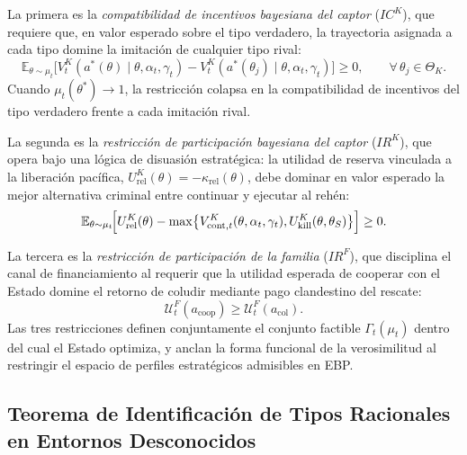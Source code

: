 \documentclass[review,authoryear,12pt]{elsarticle}
\theoremstyle{plain}
\theoremstyle{definition}
\newcommand{\E}{\mathbb{E}}
\newcommand{\ThetaK}{\Theta_K}
\newcommand{\1}{\mathbf{1}}
\begin{document}
La primera es la \emph{compatibilidad de incentivos bayesiana del captor} ($IC^K$), que requiere que, en valor esperado sobre el tipo verdadero, la trayectoria asignada a cada tipo domine la imitación de cualquier tipo rival:
\begin{equation}
\E_{\theta\sim\mu_t}\!\bigl[V^K_t(a^\ast(\theta)\mid\theta,\alpha_t,\gamma_t)-V^K_t(a^\ast(\theta_j)\mid\theta,\alpha_t,\gamma_t)\bigr]\ge 0,\qquad\forall\,\theta_j\in\ThetaK.
\label{eq:ic-kidnapper}
\end{equation}
Cuando $\mu_t(\theta^\ast)\to 1$, la restricción colapsa en la compatibilidad de incentivos del tipo verdadero frente a cada imitación rival.

La segunda es la \emph{restricción de participación bayesiana del captor} ($IR^K$), que opera bajo una lógica de disuasión estratégica: la utilidad de reserva vinculada a la liberación pacífica, $U^K_{\mathrm{rel}}(\theta)=-\kappa_{\mathrm{rel}}(\theta)$, debe dominar en valor esperado la mejor alternativa criminal entre continuar y ejecutar al rehén:
\begin{equation}
\E_{\theta\sim\mu_t}\!\Bigl[U^K_{\mathrm{rel}}(\theta)-\max\bigl\{V^K_{\mathrm{cont},t}(\theta,\alpha_t,\gamma_t),U^K_{\mathrm{kill}}(\theta,\theta_S)\bigr\}\Bigr]\ge 0.
\label{eq:ir-K}
\end{equation}

La tercera es la \emph{restricción de participación de la familia} ($IR^F$), que disciplina el canal de financiamiento al requerir que la utilidad esperada de cooperar con el Estado domine el retorno de coludir mediante pago clandestino del rescate:
\begin{equation}
\mathcal{U}^F_t(a_{\mathrm{coop}})\ge\mathcal{U}^F_t(a_{\mathrm{col}}).
\label{eq:ir-family}
\end{equation}
Las tres restricciones definen conjuntamente el conjunto factible $\Gamma_t(\mu_t)$ dentro del cual el Estado optimiza, y anclan la forma funcional de la verosimilitud al restringir el espacio de perfiles estratégicos admisibles en EBP.

\subsection{Teorema de Identificación de Tipos Racionales en Entornos Desconocidos}\label{subsec:formal-defs}
\end{document}
